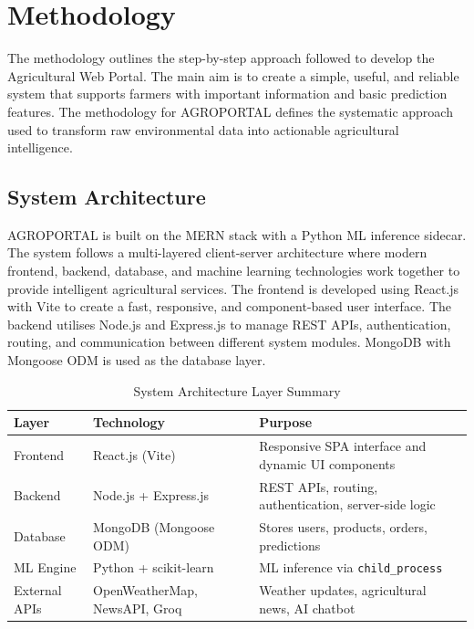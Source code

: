 
\section{Methodology}

The methodology outlines the step-by-step approach followed to develop the Agricultural Web Portal. The main aim is to create a simple, useful, and reliable system that supports farmers with important information and basic prediction features. The methodology for AGROPORTAL defines the systematic approach used to transform raw environmental data into actionable agricultural intelligence.

\subsection{System Architecture}

AGROPORTAL is built on the MERN stack with a Python ML inference sidecar. The system follows a multi-layered client-server architecture where modern frontend, backend, database, and machine learning technologies work together to provide intelligent agricultural services. The frontend is developed using React.js with Vite to create a fast, responsive, and component-based user interface. The backend utilises Node.js and Express.js to manage REST APIs, authentication, routing, and communication between different system modules. MongoDB with Mongoose ODM is used as the database layer.

\begin{table}[ht]
\centering
\caption{System Architecture Layer Summary}
\label{tab:sys_arch}
\begin{tabular}{|p{2.8cm}|p{3.8cm}|p{6cm}|}
\hline
\textbf{Layer} & \textbf{Technology} & \textbf{Purpose} \\
\hline
Frontend & React.js (Vite) & Responsive SPA interface and dynamic UI components \\
\hline
Backend & Node.js + Express.js & REST APIs, routing, authentication, server-side logic \\
\hline
Database & MongoDB (Mongoose ODM) & Stores users, products, orders, predictions \\
\hline
ML Engine & Python + scikit-learn & ML inference via \texttt{child\_process} \\
\hline
External APIs & OpenWeatherMap, NewsAPI, Groq & Weather updates, agricultural news, AI chatbot \\
\hline
\end{tabular}
\end{table}

